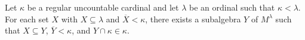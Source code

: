 Let $\kappa$ be a regular uncountable cardinal and let $\lambda$ be an ordinal such that $\kappa < \lambda$. For each set $X$ with $X \subseteq \lambda$ and $\overline{X} < \kappa$, there exists a subalgebra $Y$ of $M^{\lambda}$ such that $X \subseteq Y$, $\overline{Y} < \kappa$, and $Y \cap \kappa \in \kappa$.
